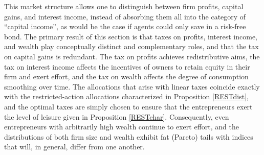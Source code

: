 \documentclass[11pt]{article}
\theoremstyle{plain}
\begin{document}
This market structure allows one to distinguish between firm profits, capital gains, and interest income, instead of absorbing them all into the category of ``capital income'', as would be the case if agents could only save in a risk-free bond. The primary result of this section is that taxes on profits, interest income, and wealth play conceptually distinct and complementary roles, and that the tax on capital gains is redundant. The tax on profits achieves redistributive aims, the tax on interest income affects the incentives of owners to retain equity in their firm and exert effort, and the tax on wealth affects the degree of consumption smoothing over time. The allocations that arise with linear taxes coincide exactly with the restricted-action allocations characterized in Proposition \ref{RESTdist}, and the optimal taxes are simply chosen to ensure that the entrepreneurs exert the level of leisure given in Proposition \ref{RESTchar}. Consequently, even entrepreneurs with arbitrarily high wealth continue to exert effort, and the distributions of both firm size and wealth exhibit fat (Pareto) tails with indices that will, in general, differ from one another. 
\end{document}

